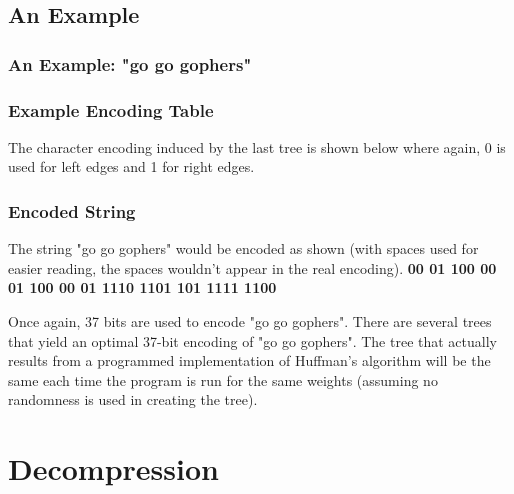 \documentclass[12pt]{report}
\begin{document}
\section{An Example}

\subsection{An Example: "go go gophers"}


\subsection{Example Encoding Table}

The character encoding induced by the last tree is shown below where again, 0 is used for left edges and 1 for right edges.

\begin{figure}[h!]
	\centering
\end{figure}

\subsection{Encoded String}

The string "go go gophers" would be encoded as shown (with spaces used for easier reading, the spaces wouldn't appear in the real encoding).
\textbf{00 01 100 00 01 100 00 01 1110 1101 101 1111 1100}

Once again, 37 bits are used to encode "go go gophers". There are several trees that yield an optimal 37-bit encoding of "go go gophers". The tree that actually results from a programmed implementation of Huffman's algorithm will be the same each time the program is run for the same weights (assuming no randomness is used in creating the tree).



\pagestyle{fancy}
\chead{}
\rfoot{\small{\thepage}}
\renewcommand{\headrulewidth}{0.4pt}
\renewcommand{\footrulewidth}{0.4pt}

\chapter{Decompression}
\end{document}
